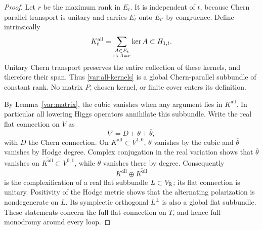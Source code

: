 \begin{proof}
Let $r$ be the maximum rank in $E_t$.  It is independent of $t$,
because Chern parallel transport is unitary and carries $E_t$ onto
$E_{t'}$ by congruence.  Define intrinsically
\begin{equation}
 K_t^{\mathrm{all}}=
      \sum_{\substack{A\in E_t\\\operatorname{rk} A=r}}\ker A\subset H_{1,t}.
 \label{var:all-kernels}
\end{equation}
Unitary Chern transport preserves the entire collection of these
kernels, and therefore their span.  Thus \eqref{var:all-kernels}
is a global Chern-parallel subbundle of constant rank.  No matrix
$P$, chosen kernel, or finite cover enters its definition.

By Lemma~\ref{var:matrix}, the cubic vanishes when any argument lies
in $K^{\mathrm{all}}$.  In particular all lowering Higgs operators
annihilate this subbundle.  Write the real flat connection on $V$ as
\[
                       \nabla=D+\theta+\overline\theta,
\]
with $D$ the Chern connection.  On $K^{\mathrm{all}}\subset V^{1,0}$,
$\theta$ vanishes by the cubic and $\overline\theta$ vanishes by
Hodge degree.  Complex conjugation in the real variation shows that
$\overline\theta$ vanishes on
$\overline{K^{\mathrm{all}}}\subset V^{0,1}$, while $\theta$ vanishes
there by degree.  Consequently
\[
       K^{\mathrm{all}}\oplus\overline{K^{\mathrm{all}}}
\]
is the complexification of a real flat subbundle $L\subset V_\mathbb R$;
its flat connection is unitary.  Positivity of the Hodge metric
shows that the alternating polarization is nondegenerate on $L$.
Its symplectic orthogonal $L^\perp$ is also a global flat subbundle.
These statements concern the full flat connection on $T$, and hence
full monodromy around every loop.


\end{proof}
